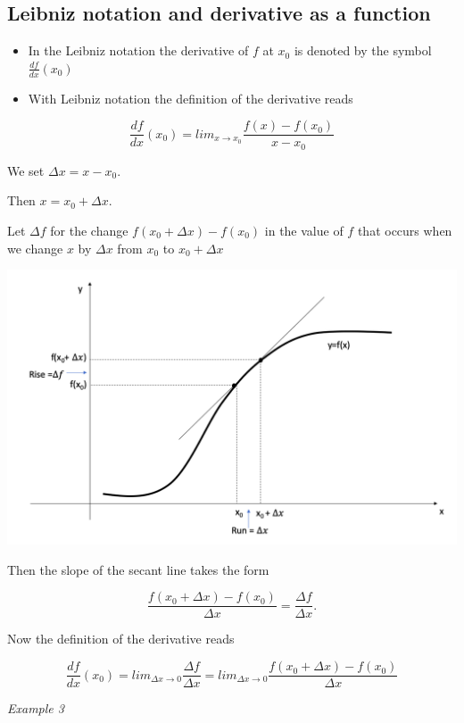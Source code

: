 \documentclass[]{book}
\begin{document}
\newpage

\hypertarget{leibniz-notation-and-derivative-as-a-function}{%
\subsection{Leibniz notation and derivative as a function}\label{leibniz-notation-and-derivative-as-a-function}}

\begin{itemize}
\item
  In the Leibniz notation the derivative of \(f\) at \(x_0\) is denoted by the symbol \(\frac{df}{dx}(x_0)\)
\item
  With Leibniz notation the definition of the derivative reads
\end{itemize}

\[\frac{df}{dx}(x_0)= lim_{x\to x_{0}}\frac{f(x)-f(x_0)}{x-x_0}\]

We set \(\Delta x = x-x_0.\)

Then \(x = x_0+ \Delta x\).

Let \(\Delta f\) for the change \(f(x_0 + \Delta x) - f(x_0)\) in the value of \(f\) that occurs when we change \(x\) by \(\Delta x\) from \(x_0\) to \(x_0+\Delta x\)

\begin{center}\includegraphics[width=0.7\linewidth]{figure/5Derivatives-11} \end{center}

Then the slope of the secant line takes the form

\[\frac{f(x_0 +\Delta x)-f(x_0)}{\Delta x }= \frac{\Delta f}{\Delta x}.\]

Now the definition of the derivative reads

\[\frac{df}{dx} (x_0) = lim_{\Delta x\to 0}\frac{\Delta f}{\Delta x}= lim_{\Delta x\to 0} \frac{f(x_0 +\Delta x)-f(x_0)}{\Delta x }\]

\newpage

\emph{Example 3}
\end{document}
